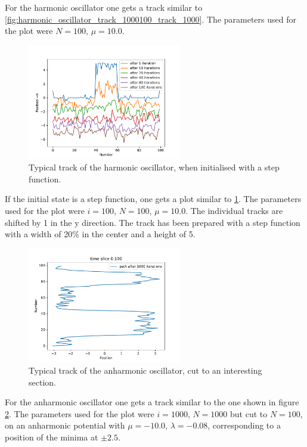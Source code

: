 \documentclass{scrartcl}
\begin{document}
		For the harmonic oscillator one gets a track similar to \ref{fig:harmonic_oscillator_track_1000100_track_1000}.
		The parameters used for the plot were $N=100$, $\mu = 10.0$.
		\begin{figure}[H]
			\centering
				\includegraphics[width=0.6\textwidth]{../imgs/harmonic_oscillator_track/track_100100_step_track_shifted_double.pdf}
			\caption{Typical track of the harmonic oscillator, when initialised with a step function.}
			\label{fig:harmonic_oscillator_track_100100_100100_step_track_shifted_double}
		\end{figure}
		If the initial state is a step function, one gets a plot similar to \ref{fig:harmonic_oscillator_track_100100_100100_step_track_shifted_double}.
		The parameters used for the plot were $i=100$, $N=100$, $\mu = 10.0$.
		The individual tracks are shifted by 1 in the y direction.
		The track has been prepared with a step function with a width of 20\% in the center and a height of 5.
		\begin{figure}[H]
			\centering
				\includegraphics[width=0.6\textwidth]{../imgs/anharmonic_oscillator_track/track_100010005_track_pretty_1000.pdf}
			\caption{Typical track of the anharmonic oscillator, cut to an interesting section.}
			\label{fig:anharmonic_oscillator_track_100010005_track_pretty_1000}
		\end{figure}
		For the anharmonic oscillator one gets a track similar to the one shown in figure \ref{fig:anharmonic_oscillator_track_100010005_track_pretty_1000}.
		The parameters used for the plot were $i=1000$, $N=1000$ but cut to $N=100$, on an anharmonic potential with $\mu = -10.0$, $\lambda = -0.08$, corresponding to a position of the minima at $\pm 2.5$.
\end{document}
